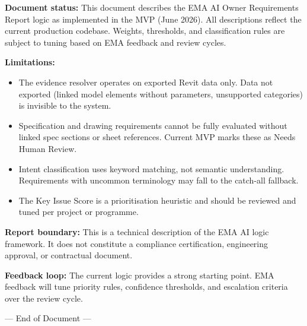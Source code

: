 \documentclass[10pt,letterpaper]{article}
\newcommand{\muted}[1]{\textcolor{emaMuted}{#1}}
\begin{document}
\begin{tcolorbox}[colback=white]
\small
\textbf{Document status:} This document describes the EMA AI Owner Requirements Report logic as
implemented in the MVP (June 2026). All descriptions reflect the current production codebase.
Weights, thresholds, and classification rules are subject to tuning based on EMA feedback and review
cycles.

\vspace{6pt}
\textbf{Limitations:}
\begin{itemize}
  \item The evidence resolver operates on exported Revit data only. Data not exported (linked model
        elements without parameters, unsupported categories) is invisible to the system.
  \item Specification and drawing requirements cannot be fully evaluated without linked spec sections
        or sheet references. Current MVP marks these as Needs Human Review.
  \item Intent classification uses keyword matching, not semantic understanding. Requirements with
        uncommon terminology may fall to the catch-all fallback.
  \item The Key Issue Score is a prioritisation heuristic and should be reviewed and tuned per
        project or programme.
\end{itemize}

\vspace{6pt}
\textbf{Report boundary:} This is a technical description of the EMA AI logic framework. It does not
constitute a compliance certification, engineering approval, or contractual document.

\vspace{6pt}
\textbf{Feedback loop:} The current logic provides a strong starting point. EMA feedback will tune
priority rules, confidence thresholds, and escalation criteria over the review cycle.
\end{tcolorbox}

\vfill
\begin{center}
\muted{--- End of Document ---}
\end{center}
\end{document}
